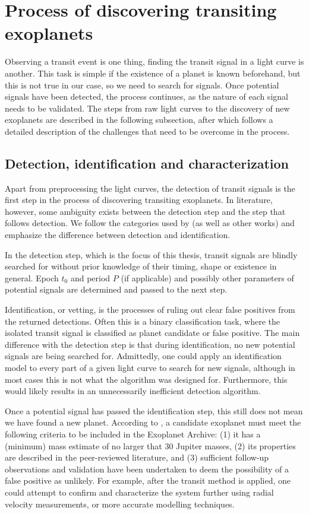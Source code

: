 
\section{Process of discovering transiting exoplanets}
Observing a transit event is one thing, finding the transit signal in a light curve is another. This task is simple if the existence of a planet is known beforehand, but this is not true in our case, so we need to search for signals. Once potential signals have been detected, the process continues, as the nature of each signal needs to be validated. The steps from raw light curves to the discovery of new exoplanets are described in the following subsection, after which follows a detailed description of the challenges that need to be overcome in the process.

\subsection{Detection, identification and characterization}
\label{sec:disc_process}

Apart from preprocessing the light curves, the detection of transit signals is the first step in the process of discovering transiting exoplanets. In literature, however, some ambiguity exists between the detection step and the step that follows detection. We follow the categories used by  \cite{jaratransiting} (as well as other works) and emphasize the difference between detection and identification.

In the detection step, which is the focus of this thesis, transit signals are blindly searched for without prior knowledge of their timing, shape or existence in general. Epoch $t_0$ and period $P$ (if applicable) and possibly other parameters of potential signals are determined and passed to the next step.

Identification, or vetting, is the processes of ruling out clear false positives from the returned detections. Often this is a binary classification task, where the isolated transit signal is classified as planet candidate or false positive. The main difference with the detection step is that during identification, no new potential signals are being searched for. Admittedly, one could apply an identification model to every part of a given light curve to search for new signals, although in most cases this is not what the algorithm was designed for. Furthermore, this would likely results in an unnecessarily inefficient detection algorithm.

Once a potential signal has passed the identification step, this still does not mean we have found a new planet. According to \cite{akeson2013nasa}, a candidate exoplanet must meet the following criteria to be included in the Exoplanet Archive: (1) it has a (minimum) mass estimate of no larger that 30 Jupiter masses, (2) its properties are described in the peer-reviewed literature, and (3) sufficient follow-up observations and validation have been undertaken to deem the possibility of a false positive as unlikely. For example, after the transit method is applied, one could attempt to confirm and characterize the system further using radial velocity measurements, or more accurate modelling techniques.


